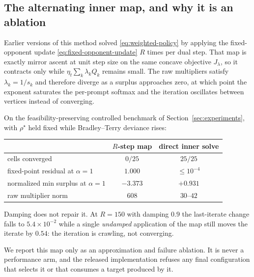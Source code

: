 \subsection{The alternating inner map, and why it is an ablation}
\label{app:rstep-ablation}

Earlier versions of this method solved \eqref{eq:weighted-policy} by applying the
fixed-opponent update \eqref{eq:fixed-opponent-update} $R$ times per dual step.
That map is exactly mirror ascent at unit step size on the same concave objective
$J_\lambda$, so it contracts only while $\eta_t\sum_k\lambda_kQ_k$ remains small.
The raw multipliers satisfy $\lambda_k=1/s_k$ and therefore diverge as a surplus
approaches zero, at which point the exponent saturates the per-prompt softmax and
the iteration oscillates between vertices instead of converging.

On the feasibility-preserving controlled benchmark of
Section~\ref{sec:experiments}, with $\rho^\star$ held fixed while Bradley--Terry
deviance rises:

\begin{center}
\begin{tabular}{lcc}
\toprule
 & $R$-step map & direct inner solve \\
\midrule
cells converged & $0/25$ & $25/25$ \\
fixed-point residual at $\alpha=1$ & $1.000$ & $\le10^{-4}$ \\
normalized min surplus at $\alpha=1$ & $-3.373$ & $+0.931$ \\
raw multiplier norm & $608$ & $30$--$42$ \\
\bottomrule
\end{tabular}
\end{center}

Damping does not repair it. At $R=150$ with damping $0.9$ the last-iterate change
falls to $5.4\times10^{-2}$ while a single \emph{undamped} application of the map
still moves the iterate by $0.54$: the iteration is crawling, not converging.

We report this map only as an approximation and failure ablation. It is never a
performance arm, and the released implementation refuses any final configuration
that selects it or that consumes a target produced by it.
